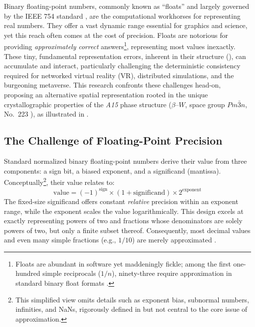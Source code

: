 \documentclass[10pt]{article}
\def\AAAB{\textit{A15}}
\def\betaW{$\beta$--$W$}
\begin{document}
Binary floating-point numbers, commonly known as ``floats'' and largely governed by the IEEE 754 standard \cite{IEEE754-2019}, are the computational workhorses for representing real numbers. They offer a vast dynamic range essential for graphics and science, yet this reach often comes at the cost of precision. Floats are notorious for providing \emph{approximately correct} answers\footnote{Floats are abundant in software yet maddeningly fickle; among the first one-hundred simple reciprocals ($1/n$), ninety-three require approximation in standard binary float formats \cite{Goldberg1991}.}, representing most values inexactly. These tiny, fundamental representation errors, inherent in their structure (), can accumulate and interact, particularly challenging the deterministic consistency required for networked virtual reality (VR), distributed simulations, and the burgeoning metaverse. This research confronts these challenges head-on, proposing an alternative spatial representation rooted in the unique crystallographic properties of the \AAAB{} phase structure (\betaW{}, space group $Pm\bar{3}n$, No.~223 \cite{ITCVolumeA2016}), as illustrated in .

\subsection{The Challenge of Floating-Point Precision}\label{subsec-intro-floats}

Standard normalized binary floating-point numbers derive their value from three components: a sign bit, a biased exponent, and a significand (mantissa). Conceptually\footnote{This simplified view omits details such as exponent bias, subnormal numbers, infinities, and NaNs, rigorously defined in \cite{IEEE754-2019} but not central to the core issue of approximation.}, their value relates to:
\begin{equation} \label{eq-float-representation}
    \text{value} = (-1)^{\text{sign}} \times (1 + \text{significand}) \times 2^{\text{exponent}}
\end{equation}
The fixed-size significand offers constant \emph{relative} precision within an exponent range, while the exponent scales the value logarithmically. This design excels at exactly representing powers of two and fractions whose denominators are solely powers of two, but only a finite subset thereof. Consequently, most decimal values and even many simple fractions (e.g., $1/10$) are merely approximated \cite{Goldberg1991}.
\end{document}
